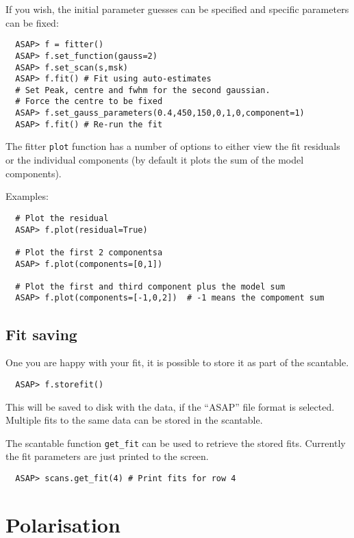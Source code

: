 \documentclass[11pt]{article}
\newcommand{\cmd}[1]{{\tt #1}}
\begin{document}
If you wish, the initial parameter guesses can be specified and
specific parameters can be fixed:

\begin{verbatim}
  ASAP> f = fitter()
  ASAP> f.set_function(gauss=2)
  ASAP> f.set_scan(s,msk)
  ASAP> f.fit() # Fit using auto-estimates
  # Set Peak, centre and fwhm for the second gaussian.
  # Force the centre to be fixed
  ASAP> f.set_gauss_parameters(0.4,450,150,0,1,0,component=1)
  ASAP> f.fit() # Re-run the fit
\end{verbatim}

The fitter \cmd{plot} function has a number of options to either view
the fit residuals or the individual components (by default it plots
the sum of the model components).

Examples:

\begin{verbatim}
  # Plot the residual
  ASAP> f.plot(residual=True)

  # Plot the first 2 componentsa
  ASAP> f.plot(components=[0,1])

  # Plot the first and third component plus the model sum
  ASAP> f.plot(components=[-1,0,2])  # -1 means the compoment sum
\end{verbatim}

\subsection{Fit saving}

One you are happy with your fit, it is
possible to store it as part of the scantable.

\begin{verbatim}
  ASAP> f.storefit()
\end{verbatim}

This will be saved to disk with the data, if the ``ASAP'' file format
is selected. Multiple fits to the same data can be stored in the
scantable.

The scantable function \cmd{get\_fit} can be used to retrieve the
stored fits. Currently the fit parameters are just printed to the
screen.

\begin{verbatim}
  ASAP> scans.get_fit(4) # Print fits for row 4
\end{verbatim}

\section{Polarisation}
\end{document}
